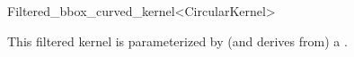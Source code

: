 \begin{ccRefClass}{Filtered_bbox_curved_kernel<CircularKernel>}

\ccDefinition


\ccIsModel


\ccParameters

This filtered kernel is parameterized by (and derives from) a . 

\end{ccRefClass}
